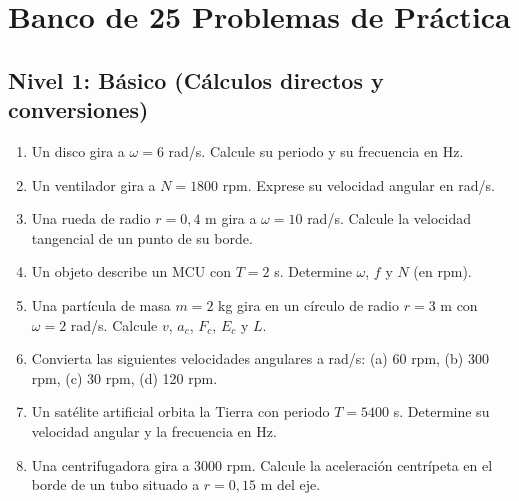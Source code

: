 \documentclass[12pt]{article}
\begin{document}
\newpage

\section*{Banco de 25 Problemas de Práctica}

\subsection*{Nivel 1: Básico (Cálculos directos y conversiones)}
\begin{enumerate}
  \item Un disco gira a \(\omega = 6\) rad/s. Calcule su periodo y su frecuencia en Hz.
  \item Un ventilador gira a \(N = 1800\) rpm. Exprese su velocidad angular en rad/s.
  \item Una rueda de radio \(r = 0{,}4\) m gira a \(\omega = 10\) rad/s. Calcule la velocidad tangencial de un punto de su borde.
  \item Un objeto describe un MCU con \(T = 2\) s. Determine \(\omega\), \(f\) y \(N\) (en rpm).
  \item Una partícula de masa \(m = 2\) kg gira en un círculo de radio \(r = 3\) m con \(\omega = 2\) rad/s. Calcule \(v\), \(a_c\), \(F_c\), \(E_c\) y \(L\).
  \item Convierta las siguientes velocidades angulares a rad/s: (a) 60 rpm, (b) 300 rpm, (c) 30 rpm, (d) 120 rpm.
  \item Un satélite artificial orbita la Tierra con periodo \(T = 5400\) s. Determine su velocidad angular y la frecuencia en Hz.
  \item Una centrifugadora gira a 3000 rpm. Calcule la aceleración centrípeta en el borde de un tubo situado a \(r = 0{,}15\) m del eje.
\end{enumerate}
\end{document}
